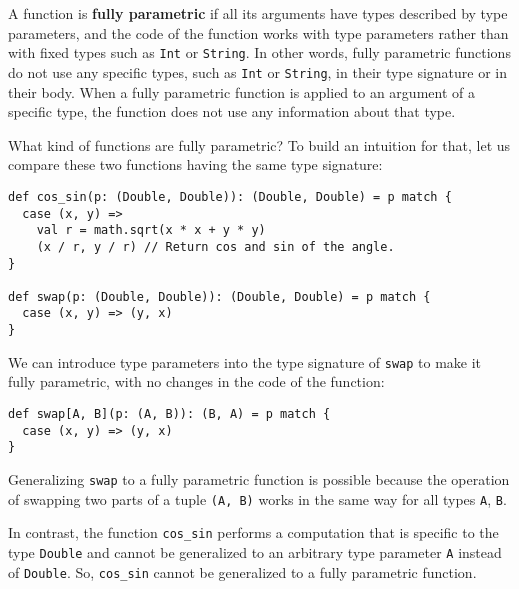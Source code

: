 A function is \textbf{fully parametric}
if all its arguments have types described by type parameters, and
the code of the function works with type parameters rather than with
fixed types such as \lstinline!Int!
or \lstinline!String!.
In other words, fully parametric functions do not use any specific
types, such as \lstinline!Int!
or \lstinline!String!,
in their type signature or in their body. When a fully parametric
function is applied to an argument of a specific type, the function
does not use any information about that type. 

What kind of functions are fully parametric? To build an intuition
for that, let us compare these two functions having the same type
signature:
\begin{lstlisting}
def cos_sin(p: (Double, Double)): (Double, Double) = p match {
  case (x, y) =>
    val r = math.sqrt(x * x + y * y)
    (x / r, y / r) // Return cos and sin of the angle.
}

def swap(p: (Double, Double)): (Double, Double) = p match {
  case (x, y) => (y, x)
}
\end{lstlisting}
We can introduce type parameters into the type signature of \lstinline!swap!
to make it fully parametric, with no changes in the code of the function:
\begin{lstlisting}
def swap[A, B](p: (A, B)): (B, A) = p match {
  case (x, y) => (y, x)
}
\end{lstlisting}
Generalizing \lstinline!swap!
to a fully parametric function is possible because the operation of
swapping two parts of a tuple \lstinline!(A, B)!
works in the same way for all types \lstinline!A!,
\lstinline!B!.

In contrast, the function \lstinline!cos_sin!
performs a computation that is specific to the type \lstinline!Double!
and cannot be generalized to an arbitrary type parameter \lstinline!A!
instead of \lstinline!Double!.
So, \lstinline!cos_sin!
cannot be generalized to a fully parametric function.

